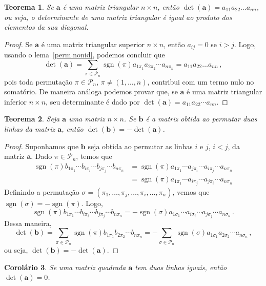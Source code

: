\documentclass[12pt,a4paper]{report}
\newcommand{\mb}{\mathbf}
\newcommand{\mc}{\mathcal}
\newtheorem{thm}{Teorema}[chapter]
\newtheorem{cor}[thm]{Corolário}
\DeclareMathOperator{\sgn}{sgn}
\begin{document}
\begin{thm}
  Se $\mb a$ é uma matriz triangular $n\times n$, então $\det(\mb a)=a_{11}a_{22}\ldots a_{nn}$, ou seja, o determinante de uma matriz triangular é igual ao produto dos elementos da sua diagonal.
\end{thm}
\begin{proof}
  Se $\mb a$ é uma matriz triangular superior $n\times n$, então $a_{ij}=0$ se $i>j$. Logo, usando o lema~\ref{perm.nonid}, podemos concluir que
  $$\det(\mb a)=\sum_{\pi\in\mc P_n}\sgn(\pi)a_{1\pi_1}a_{2\pi_2}\cdots a_{n\pi_n}=a_{11}a_{22}\ldots a_{nn}\,,$$
  pois toda permutação $\pi\in\mc P_n$, $\pi\ne (1,\ldots,n)$, contribui com um termo nulo no somatório. De maneira análoga podemos provar que, se $\mb a$ é uma matriz triangular inferior $n\times n$, seu determinante é dado por $\det(\mb a)=a_{11}a_{22}\cdots a_{nn}$.
\end{proof}

\begin{thm}
  \label{det.anti}
  Seja $\mb a$ uma matriz $n\times n$. Se $\mb b$ é a matriz obtida ao permutar duas linhas da matriz $\mb a$, então $\det(\mb b)=-\det(\mb a)$.
\end{thm}
\begin{proof}
  Suponhamos que $\mb b$ seja obtida ao permutar as linhas $i$ e $j$, $i<j$, da matriz $\mb a$. Dado $\pi\in\mc P_n$, temos que
  \begin{equation*}
    \begin{split}
      \sgn(\pi)b_{1\pi_1}\cdots b_{i\pi_i}\cdots b_{j\pi_j}\cdots b_{n\pi_n}&=\sgn(\pi)a_{1\pi_1}\cdots a_{j\pi_i}\cdots a_{i\pi_j}\cdots a_{n\pi_n}\\
      &=\sgn(\pi)a_{1\pi_1}\cdots a_{i\pi_j}\cdots a_{j\pi_i}\cdots a_{n\pi_n}
    \end{split}
  \end{equation*}
  Definindo a permutação $\sigma=(\pi_1,\ldots,\pi_j,\ldots,\pi_i,\ldots,\pi_n)$, vemos que $\sgn(\sigma)=-\sgn(\pi)$. Logo,
  $$\sgn(\pi)b_{1\pi_1}\cdots b_{i\pi_i}\cdots b_{j\pi_j}\cdots b_{n\pi_n}=-\sgn(\sigma)a_{1\sigma_1}\cdots a_{i\sigma_i}\cdots a_{j\sigma_j}\cdots a_{n\sigma_n}\,.$$
  Dessa maneira,
  $$\det(\mb b)=\sum_{\pi\in\mc P_n}\sgn(\pi)b_{1\pi_1}b_{2\pi_2}\cdots b_{n\pi_n}=-\sum_{\sigma\in\mc P_n}\sgn(\sigma)a_{1\sigma_1}a_{2\sigma_2}\cdots a_{n\sigma_n}\,,$$
  ou seja, $\det(\mb b)=-\det(\mb a)$.
\end{proof}
\begin{cor}
  Se uma matriz quadrada $\mb a$ tem duas linhas iguais, então $\det(\mb a)=0$.
\end{cor}
\end{document}
